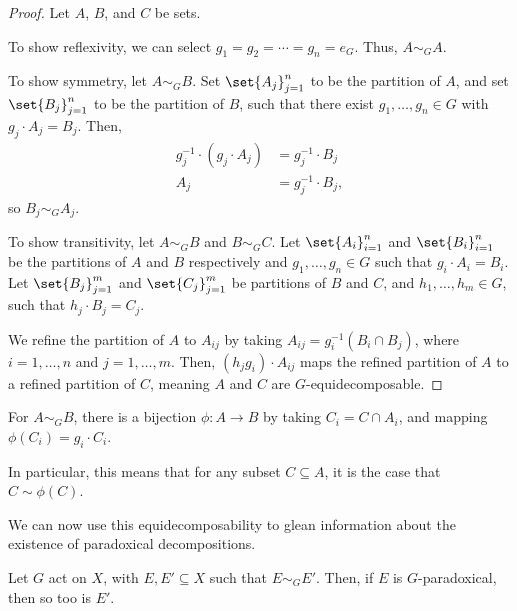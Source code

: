 \begin{proof}
  Let $A$, $B$, and $C$ be sets.\newline

  To show reflexivity, we can select $g_1 = g_2 = \cdots = g_n = e_G$. Thus, $A\sim_{G}A$.\newline

  To show symmetry, let $A\sim_{G} B$. Set $\set{A_j}_{j=1}^{n}$ to be the partition of $A$, and set $\set{B_j}_{j=1}^{n}$ to be the partition of $B$, such that there exist $g_1,\dots,g_n\in G$ with $g_j\cdot A_j = B_j$. Then,
  \begin{align*}
    g_j^{-1}\cdot \left(g_j\cdot A_j\right) &= g_j^{-1}\cdot B_j\\
    A_j &= g_j^{-1}\cdot B_j,
  \end{align*}
  so $B_j\sim_{G}A_j$.\newline

  To show transitivity, let $A\sim_{G} B$ and $B\sim_{G} C$. Let $\set{A_i}_{i=1}^{n}$ and $\set{B_i}_{i=1}^{n}$ be the partitions of $A$ and $B$ respectively and $g_1,\dots,g_n\in G$ such that $g_i\cdot A_i = B_i$. Let $\set{B_j}_{j=1}^{m}$ and $\set{C_j}_{j=1}^{m}$ be partitions of $B$ and $C$, and $h_1,\dots,h_m\in G$, such that $h_j\cdot B_j = C_j$.\newline

  We refine the partition of $A$ to $A_{ij}$ by taking $A_{ij} = g_i^{-1}\left(B_{i}\cap B_j\right)$, where $i = 1,\dots,n$ and $j = 1,\dots,m$. Then, $\left(h_jg_i\right)\cdot A_{ij}$ maps the refined partition of $A$ to a refined partition of $C$, meaning $A$ and $C$ are $G$-equidecomposable.
\end{proof}
\begin{fact}\label{fact:bijections}
  For $A\sim_{G} B$, there is a bijection $\phi: A\rightarrow B$ by taking $C_{i} = C\cap A_i$, and mapping $\phi\left(C_i\right) = g_i\cdot C_i$.\newline

  In particular, this means that for any subset $C\subseteq A$, it is the case that $C\sim \phi(C)$.
\end{fact}

We can now use this equidecomposability to glean information about the existence of paradoxical decompositions.
\begin{proposition}
  Let $G$ act on $X$, with $E,E'\subseteq X$ such that $E\sim_{G}E'$. Then, if $E$ is $G$-paradoxical, then so too is $E'$.
\end{proposition}

